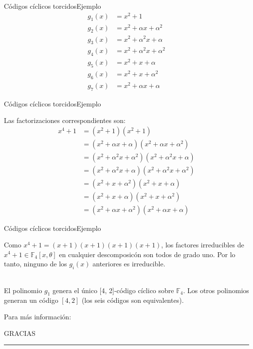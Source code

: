 \documentclass[aspectratio=43,14pt,spanish]{beamer}
\theoremstyle{definition} %
\begin{document}
    \begin{frame}{Códigos cíclicos torcidos}{Ejemplo}
        \begin{align*}
            g_1(x) &= x^2 + 1 \\
            g_2(x) &= x^2 + \alpha x + \alpha ^2 \\
            g_3(x) &=  x^2 + \alpha^2 x + \alpha \\
            g_4(x) &=  x^2 + \alpha^2 x + \alpha^2 \\
            g_5(x) &=  x^2 + x + \alpha \\
            g_6(x) &=  x^2 + x + \alpha^2 \\
            g_7(x) &= x^2 + \alpha x + \alpha
        \end{align*}

    \end{frame}
    \begin{frame}{Códigos cíclicos torcidos}{Ejemplo}

        Las factorizaciones correspondientes son:
        \begin{align*}
            x^4 + 1 &= (x^2 + 1)(x^2 + 1) \\
                    &= (x^2 + \alpha x + \alpha)(x^2 + \alpha x + \alpha ^2)\\
                    &= (x^2 + \alpha^2 x + \alpha^2)(x^2 + \alpha^2 x + \alpha)\\
                    &= (x^2 + \alpha^2 x + \alpha)(x^2 + \alpha^2 x + \alpha^2)\\
                    &= (x^2 + x + \alpha^2)(x^2 + x + \alpha)\\
                    &= (x^2 + x + \alpha)(x^2 + x + \alpha^2)\\
                    &= (x^2 + \alpha x + \alpha ^2)(x^2 + \alpha x + \alpha)
        \end{align*}

    \end{frame}
    \begin{frame}{Códigos cíclicos torcidos}{Ejemplo}

        Como  $x^4 + 1 = (x + 1)(x + 1)(x + 1)(x + 1)$, los factores irreducibles de $x^4 + 1 \in \mathbb{F}_4[x, \theta]$ en cualquier descomposicón son todos de grado uno. Por lo tanto, ninguno de los $g_i(x)$ anteriores es irreducible.

    \ \\

        El polinomio $g_1$ genera el único [4, 2]-código cíclico sobre $\mathbb{F}_4$. Los otros polinomios generan un código $[4, 2]$ (los seis códigos son equivalentes).
    \end{frame}

    \begin{frame}[plain]
        Para más información:


    \end{frame}

    \begin{frame}[plain]
        \huge{GRACIAS}
        \vspace{2mm}
        \hrule
    \end{frame}
\end{document}
